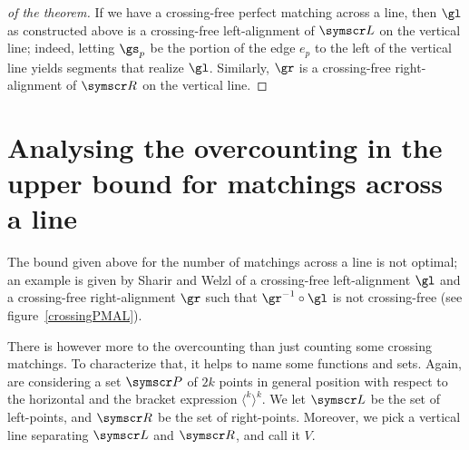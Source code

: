 \documentclass[10pt, a4paper, twoside]{basestyle}
\newcommand{\pointset}{\symscr}
\begin{document}
\begin{proof}[of the theorem]
If we have a crossing-free perfect matching across a line, then $\gl$ as constructed above is a crossing-free
left-alignment of $\pointset L$ on the vertical line; indeed, letting $\gs_p$ be the portion of the edge $e_p$
to the left of the vertical line yields segments that realize $\gl$.
Similarly, $\gr$ is a crossing-free right-alignment of $\pointset R$ on the vertical line.
\end{proof}
\section{Analysing the overcounting in the upper bound for matchings across a line}
\label{sectionOvercounting}
The bound given above for the number of matchings across a line is not optimal;
an example is given by Sharir and Welzl of a crossing-free left-alignment $\gl$ and a crossing-free
right-alignment $\gr$ such that $\gr^{-1}\Compose \gl$ is not crossing-free (see figure~\ref{crossingPMAL}).

There is however more to the overcounting than just counting some crossing matchings.
To characterize that, it helps to name some functions and sets. Again, are considering a
set $\pointset P$ of $2k$ points in general position with respect to the horizontal and the bracket
expression $\langle^k\rangle^k$.  We let $\pointset L$ be the set of left-points, and $\pointset R$ be the
set of right-points. Moreover, we pick a vertical line separating $\pointset L$ and $\pointset R$, and call it
$V$.
\end{document}
